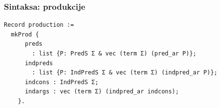 \documentclass{beamer}
\begin{document}
\begin{frame}[fragile]
  \frametitle{Sintaksa: produkcije}
  \begin{huge}
    \begin{prooftree}
    \end{prooftree}
  \end{huge}
  \begin{small}
\begin{verbatim}
Record production :=
  mkProd {
      preds
        : list {P: PredS Σ & vec (term Σ) (pred_ar P)};
      indpreds
        : list {P: IndPredS Σ & vec (term Σ) (indpred_ar P)};
      indcons : IndPredS Σ;
      indargs : vec (term Σ) (indpred_ar indcons);
    }.
\end{verbatim}
  \end{small}
\end{frame}
\end{document}

